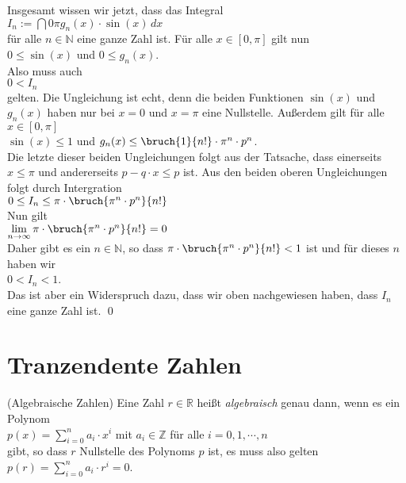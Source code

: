 Insgesamt wissen wir jetzt, dass das Integral
\\[0.2cm]
\hspace*{1.3cm}
$I_n := \dint{0}{{\pi}} g_n(x) \cdot \sin(x)\, dx$
\\[0.2cm]
f\"ur alle $n \in \mathbb{N}$ eine ganze Zahl ist.  F\"ur alle $x \in [0, \pi]$ gilt nun
\\[0.2cm]
\hspace*{1.3cm}
$0 \leq \sin(x)$ \quad und \quad $0 \leq g_n(x)$.
\\[0.2cm]
Also muss auch
\\[0.2cm]
\hspace*{1.3cm}
$0 < I_n$
\\[0.2cm]
gelten.  Die Ungleichung ist echt, denn die beiden Funktionen $\sin(x)$ und $g_n(x)$ haben
nur bei $x = 0$ und $x = \pi$ eine Nullstelle.
Au{\ss}erdem gilt f\"ur alle $x \in [0,\pi]$
\\[0.2cm]
\hspace*{1.3cm}
$\sin(x) \leq 1$ \quad und \quad $g_n(x) \leq \bruch{1}{n!} \cdot \pi^n \cdot p^n$.
\\[0.2cm]
Die letzte dieser beiden Ungleichungen folgt aus der Tatsache, dass einerseits $x \leq \pi$ und andererseits
$p - q\cdot x \leq p$ ist.  Aus den beiden oberen Ungleichungen folgt durch Intergration
\\[0.2cm]
\hspace*{1.3cm}
$0 \leq I_n \leq \pi \cdot \bruch{\pi^n \cdot p^n}{n!}$
\\[0.2cm]
Nun gilt
\\[0.2cm]
\hspace*{1.3cm}
$\lim\limits_{n \rightarrow \infty} \pi \cdot \bruch{\pi^n \cdot p^n}{n!} = 0$
\\[0.2cm]
Daher gibt es ein $n \in \mathbb{N}$, so dass $\pi \cdot \bruch{\pi^n \cdot p^n}{n!} < 1$ ist und f\"ur dieses
$n$ haben wir 
\\[0.2cm]
\hspace*{1.3cm}
$0 < I_n < 1$.
\\[0.2cm]
Das ist aber ein Widerspruch dazu, dass wir oben nachgewiesen haben, dass $I_n$ eine ganze Zahl ist.  \qed

\section{Tranzendente Zahlen}
\begin{Definition}(Algebraische Zahlen) \lb
Eine Zahl $r \in \mathbb{R}$ hei{\ss}t \emph{algebraisch} genau dann, wenn es ein Polynom
\\[0.2cm]
\hspace*{1.3cm}
$p(x) = \sum\limits_{i=0}^n a_i \cdot x^i$  \quad mit $a_i \in \mathbb{Z}$ f\"ur alle $i = 0, 1, \cdots, n$
\\[0.2cm]
gibt, so dass $r$ Nullstelle des Polynoms $p$ ist, es muss also gelten
\\[0.2cm]
\hspace*{1.3cm}
$p(r) = \sum\limits_{i=0}^n a_i \cdot r^i = 0$.  \eod
\end{Definition}

